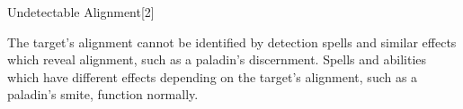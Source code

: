 \begin{spellsection}{Undetectable Alignment}[2]
    \begin{spellheader}
    \end{spellheader}
    \begin{spellcontent}
        \begin{spelltargetinginfo}
        \end{spelltargetinginfo}
        \begin{spelleffects}
            \spelleffect The target's alignment cannot be identified by detection spells and similar effects which reveal alignment, such as a paladin's discernment. Spells and abilities which have different effects depending on the target's alignment, such as a paladin's smite, function normally.
            \spelldur \durext \dismissable
        \end{spelleffects}
    \end{spellcontent}
    \begin{spellfooter}
    \end{spellfooter}
    \begin{spellaugments}
    \end{spellaugments}
\end{spellsection}

